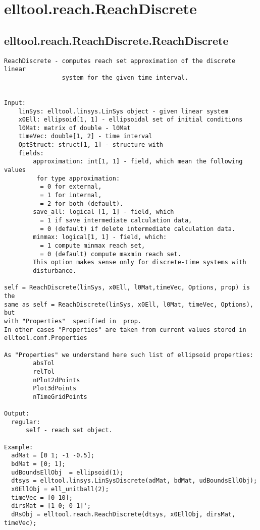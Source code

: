 \section{elltool.reach.ReachDiscrete}\label{secClassDescr:elltool.reach.ReachDiscrete}
\subsection{\texorpdfstring{elltool.reach.ReachDiscrete.ReachDiscrete}{ReachDiscrete}}\label{method:elltool.reach.ReachDiscrete.ReachDiscrete}
\begin{verbatim}
ReachDiscrete - computes reach set approximation of the discrete linear
                system for the given time interval.


Input:
    linSys: elltool.linsys.LinSys object - given linear system
    x0Ell: ellipsoid[1, 1] - ellipsoidal set of initial conditions
    l0Mat: matrix of double - l0Mat
    timeVec: double[1, 2] - time interval
    OptStruct: struct[1, 1] - structure with
    fields:
        approximation: int[1, 1] - field, which mean the following values
         for type approximation:
          = 0 for external,
          = 1 for internal,
          = 2 for both (default).
        save_all: logical [1, 1] - field, which
          = 1 if save intermediate calculation data,
          = 0 (default) if delete intermediate calculation data.
        minmax: logical[1, 1] - field, which:
          = 1 compute minmax reach set,
          = 0 (default) compute maxmin reach set.
        This option makes sense only for discrete-time systems with
        disturbance.

self = ReachDiscrete(linSys, x0Ell, l0Mat,timeVec, Options, prop) is the
same as self = ReachDiscrete(linSys, x0Ell, l0Mat, timeVec, Options), but
with "Properties"  specified in  prop.
In other cases "Properties" are taken from current values stored in
elltool.conf.Properties

As "Properties" we understand here such list of ellipsoid properties:
        absTol
        relTol
        nPlot2dPoints
        Plot3dPoints
        nTimeGridPoints

Output:
  regular:
      self - reach set object.

Example:
  adMat = [0 1; -1 -0.5];
  bdMat = [0; 1];
  udBoundsEllObj  = ellipsoid(1);
  dtsys = elltool.linsys.LinSysDiscrete(adMat, bdMat, udBoundsEllObj);
  x0EllObj = ell_unitball(2);
  timeVec = [0 10];
  dirsMat = [1 0; 0 1]';
  dRsObj = elltool.reach.ReachDiscrete(dtsys, x0EllObj, dirsMat, timeVec);
\end{verbatim}


